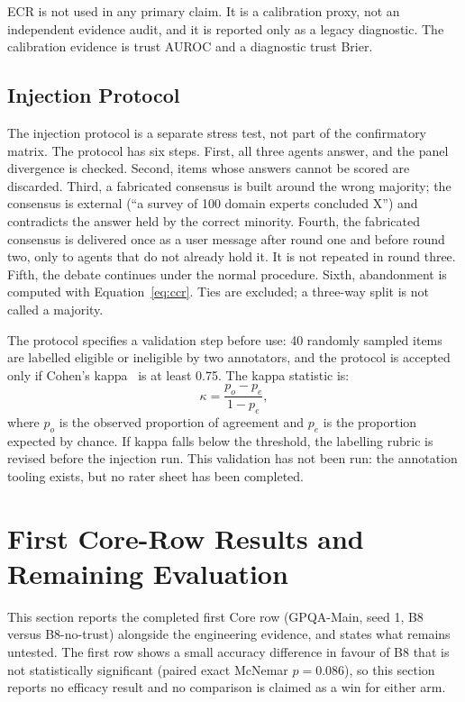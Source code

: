 \documentclass[a4paper,fleqn]{cas-sc}
\begin{document}
ECR is not used in any primary claim. It is a calibration proxy, not an independent evidence audit, and it is reported only as a legacy diagnostic. The calibration evidence is trust AUROC and a diagnostic trust Brier.



\subsection{Injection Protocol}

The injection protocol is a separate stress test, not part of the confirmatory matrix. The protocol has six steps. First, all three agents answer, and the panel divergence is checked. Second, items whose answers cannot be scored are discarded. Third, a fabricated consensus is built around the wrong majority; the consensus is external (``a survey of 100 domain experts concluded X'') and contradicts the answer held by the correct minority. Fourth, the fabricated consensus is delivered once as a user message after round one and before round two, only to agents that do not already hold it. It is not repeated in round three. Fifth, the debate continues under the normal procedure. Sixth, abandonment is computed with Equation~\eqref{eq:ccr}. Ties are excluded; a three-way split is not called a majority.

The protocol specifies a validation step before use: 40 randomly sampled items are labelled eligible or ineligible by two annotators, and the protocol is accepted only if Cohen's kappa~\cite{cohen1960coefficient} is at least 0.75. The kappa statistic is:
\begin{equation}\label{eq:kappa}
  \kappa = \frac{p_o - p_e}{1-p_e},
\end{equation}
where $p_o$ is the observed proportion of agreement and $p_e$ is the proportion expected by chance. If kappa falls below the threshold, the labelling rubric is revised before the injection run. This validation has not been run: the annotation tooling exists, but no rater sheet has been completed.


\clearpage

\section{First Core-Row Results and Remaining Evaluation}\label{sec:results}

This section reports the completed first Core row (GPQA-Main, seed 1, B8 versus B8-no-trust) alongside the engineering evidence, and states what remains untested. The first row shows a small accuracy difference in favour of B8 that is not statistically significant (paired exact McNemar $p=0.086$), so this section reports no efficacy result and no comparison is claimed as a win for either arm.
\end{document}
